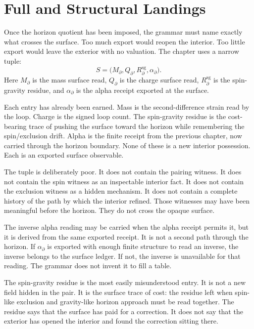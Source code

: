 \section{Full and Structural Landings}

Once the horizon quotient has been imposed, the grammar must name exactly
what crosses the surface. Too much export would reopen the interior. Too
little export would leave the exterior with no valuation. The chapter uses a
narrow tuple:
\[
  S =
  \bigl(M_{\partial}, Q_{\partial},
        R^{\mathrm{sg}}_{\partial}, \alpha_{\partial}\bigr).
\]
Here \(M_{\partial}\) is the mass surface read, \(Q_{\partial}\) is the
charge surface read, \(R^{\mathrm{sg}}_{\partial}\) is the spin-gravity
residue, and \(\alpha_{\partial}\) is the alpha receipt exported at the
surface.

Each entry has already been earned. Mass is the second-difference strain
read by the loop. Charge is the signed loop count. The spin-gravity residue
is the cost-bearing trace of pushing the surface toward the horizon while
remembering the spin/exclusion drift. Alpha is the finite receipt from the
previous chapter, now carried through the horizon boundary. None of these is
a new interior possession. Each is an exported surface observable.

The tuple is deliberately poor. It does not contain the pairing witness. It
does not contain the spin witness as an inspectable interior fact. It does
not contain the exclusion witness as a hidden mechanism. It does not contain
a complete history of the path by which the interior refined. Those
witnesses may have been meaningful before the horizon. They do not cross
the opaque surface.

The inverse alpha reading may be carried when the alpha receipt permits it,
but it is derived from the same exported receipt. It is not a second path
through the horizon. If \(\alpha_{\partial}\) is exported with enough
finite structure to read an inverse, the inverse belongs to the surface
ledger. If not, the inverse is unavailable for that reading. The grammar
does not invent it to fill a table.

The spin-gravity residue is the most easily misunderstood entry. It is not a
new field hidden in the pair. It is the surface trace of cost: the residue
left when spin-like exclusion and gravity-like horizon approach must be read
together. The residue says that the surface has paid for a correction. It
does not say that the exterior has opened the interior and found the
correction sitting there.


